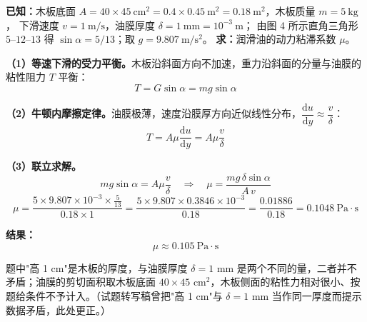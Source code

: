 

\begin{jie}
\textbf{已知：}木板底面 $A=40\times45\ \mathrm{cm^2}=0.4\times0.45\ \mathrm{m^2}=0.18\ \mathrm{m^2}$，木板质量 $m=5\ \mathrm{kg}$，
下滑速度 $v=1\ \mathrm{m/s}$，油膜厚度 $\delta=1\ \mathrm{mm}=10^{-3}\ \mathrm{m}$；
由图 4 所示直角三角形 $5$--$12$--$13$ 得 $\sin\alpha=5/13$；取 $g=9.807\ \mathrm{m/s^2}$。
\textbf{求：}润滑油的动力粘滞系数 $\mu$。

\textbf{（1）等速下滑的受力平衡。}木板沿斜面方向不加速，重力沿斜面的分量与油膜的粘性阻力 $T$ 平衡：
\[
T=G\sin\alpha=mg\sin\alpha
\]

\textbf{（2）牛顿内摩擦定律。}油膜极薄，速度沿膜厚方向近似线性分布，$\dfrac{\mathrm{d}u}{\mathrm{d}y}\approx\dfrac{v}{\delta}$：
\[
T=A\mu\frac{\mathrm{d}u}{\mathrm{d}y}=A\mu\frac{v}{\delta}
\]

\textbf{（3）联立求解。}
\[
mg\sin\alpha=A\mu\frac{v}{\delta}
\quad\Longrightarrow\quad
\mu=\frac{mg\,\delta\sin\alpha}{A\,v}
\]
\[
\mu=\frac{5\times9.807\times10^{-3}\times\frac{5}{13}}{0.18\times1}
=\frac{5\times9.807\times0.3846\times10^{-3}}{0.18}
=\frac{0.01886}{0.18}=0.1048\ \mathrm{Pa\cdot s}
\]

\textbf{结果：}
\[
\boxed{\mu\approx0.105\ \mathrm{Pa\cdot s}}
\]
\end{jie}

\begin{tishi}
题中"高 1 cm"是木板的厚度，与油膜厚度 $\delta=1$ mm 是两个不同的量，二者并不矛盾；油膜的剪切面积取木板底面
$40\times45$ cm$^2$，木板侧面的粘性力相对很小、按题给条件不予计入。（试题转写稿曾把"高 1 cm"与 $\delta=1$ mm 当作同一厚度而提示数据矛盾，此处更正。）
\end{tishi}


